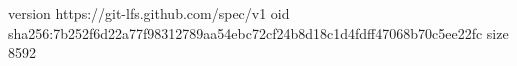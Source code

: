 version https://git-lfs.github.com/spec/v1
oid sha256:7b252f6d22a77f98312789aa54ebc72cf24b8d18c1d4fdff47068b70c5ee22fc
size 8592

